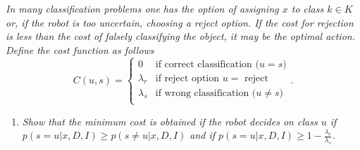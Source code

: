 \begin{example}
	\emph{In many classification problems one has the option of assigning $x$ to class $k\in K$ or, if the robot is too uncertain, choosing a reject option. If the cost for rejection is less than the cost of falsely classifying the object, it may be the optimal action. Define the cost function as follows}
	\begin{equation}
		C(u,s)=\begin{cases}
			0 & \text{if correct classification ($u=s$)}\\
			\lambda_r & \text{if reject option $u=$ reject}\\
			\lambda_s & \text{if wrong classification ($u\neq s$)}\\
		\end{cases}.
	\end{equation}
	
	\begin{enumerate}
		\item \emph{Show that the minimum cost is obtained if the robot decides on class $u$ if $p(s=u|x,D,I)\geq p(s\neq u|x,D,I)$ and if $p(s=u|x,D,I)\geq 1-\frac{\lambda_r}{\lambda_s}$.}\newline
		

\end{enumerate}
\end{example}

